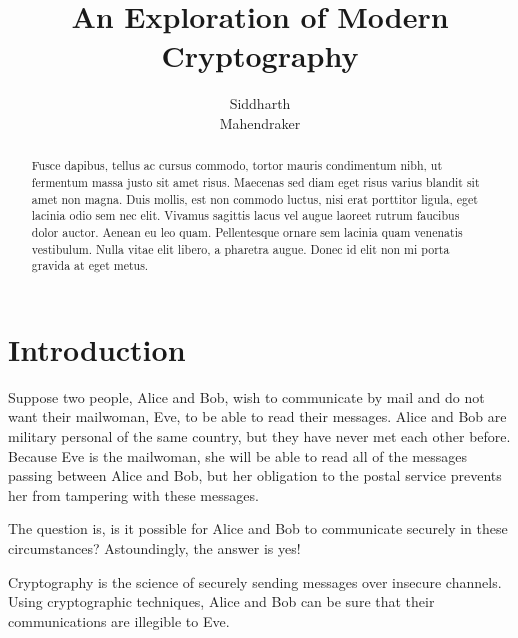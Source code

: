 \documentclass[12pt, a4paper, draft]{report}
\begin{document}
\title{An Exploration of Modern Cryptography}
\author{Siddharth\\
        Mahendraker}
\maketitle

\begin{abstract}
Fusce dapibus, tellus ac cursus commodo, tortor mauris condimentum nibh,
ut fermentum massa justo sit amet risus. Maecenas sed diam eget risus
varius blandit sit amet non magna. Duis mollis, est non commodo luctus,
nisi erat porttitor ligula, eget lacinia odio sem nec elit. Vivamus
sagittis lacus vel augue laoreet rutrum faucibus dolor auctor. Aenean
eu leo quam. Pellentesque ornare sem lacinia quam venenatis vestibulum.
Nulla vitae elit libero, a pharetra augue. Donec id elit non mi porta
gravida at eget metus.
\end{abstract}

\setcounter{secnumdepth}{3}
\renewcommand*\thesection{\arabic{section}}
\renewcommand{\cftsecfont}{\bfseries}
\newcommand{\ph}[1]{\phantom{#1}}

\setcounter{page}{1}
\tableofcontents
\clearpage
{}
\setcounter{page}{1}

\section*{Introduction}

Suppose two people, Alice and Bob, wish to communicate by mail and do not
want their mailwoman, Eve, to be able to read their messages. Alice and Bob
are military personal of the same country, but they have never met each
other before. Because Eve is the mailwoman, she will be able to read
all of the messages passing between Alice and Bob, but her obligation to
the postal service prevents her from tampering with these
messages\footnotemark.


The question is, is it possible for Alice and Bob to communicate securely
in these circumstances? Astoundingly, the answer is yes!

Cryptography is the science of securely sending messages over insecure
channels. Using cryptographic techniques, Alice and Bob can be sure that
their communications are illegible to Eve.
\end{document}
